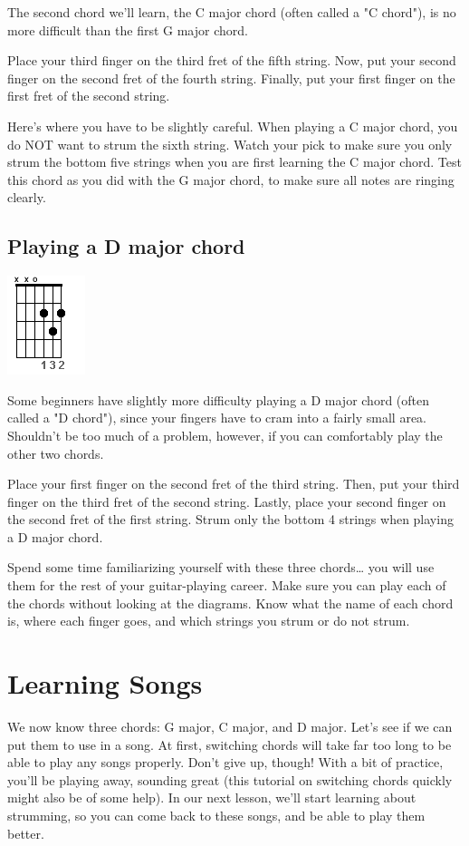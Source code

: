 The second chord we'll learn, the C major chord (often called a "C chord"), is
no more difficult than the first G major chord.

Place your third finger on the third fret of the fifth string. Now, put your
second finger on the second fret of the fourth string. Finally, put your first
finger on the first fret of the second string.

Here's where you have to be slightly careful. When playing a C major chord, you
do NOT want to strum the sixth string. Watch your pick to make sure you only
strum the bottom five strings when you are first learning the C major chord.
Test this chord as you did with the G major chord, to make sure all notes are
ringing clearly. 

\subsection{Playing a D major chord}
\includegraphics{partone/opendmajor.png}

Some beginners have slightly more difficulty playing a D major chord (often
called a "D chord"), since your fingers have to cram into a fairly small area.
Shouldn't be too much of a problem, however, if you can comfortably play the
other two chords.

Place your first finger on the second fret of the third string. Then, put your
third finger on the third fret of the second string. Lastly, place your second
finger on the second fret of the first string. Strum only the bottom 4 strings
when playing a D major chord.

Spend some time familiarizing yourself with these three chords\ldots{} you will use
them for the rest of your guitar-playing career. Make sure you can play each of
the chords without looking at the diagrams. Know what the name of each chord
is, where each finger goes, and which strings you strum or do not strum. 

\section{Learning Songs}
We now know three chords: G major, C major, and D major. Let's see if we can
put them to use in a song. At first, switching chords will take far too long to
be able to play any songs properly. Don't give up, though! With a bit of
practice, you'll be playing away, sounding great (this tutorial on switching
chords quickly might also be of some help). In our next lesson, we'll start
learning about strumming, so you can come back to these songs, and be able to
play them better.

